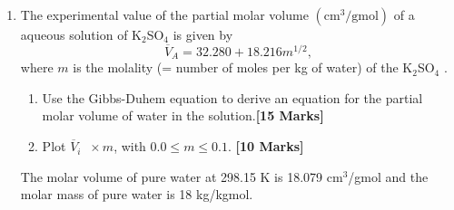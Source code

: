 \documentclass[12pts,a4paper,amsmath,amssymb,floatfix]{article}%
\renewcommand\leq{\leqslant}
\begin{document}
\begin{enumerate}[label=\bfseries Problem \arabic*]
{\begin{enumerate}
\begin{eqnarray}
                &=& 2.3281\times 10^{-2} \nonumber
           \end{eqnarray}
           The cubic equation (Eqn.~\ref{example3:cubicZ}) becomes ~\hfill{\bf [3/15]}
           \begin{displaymath}
              Z^{3} - 1.023281 Z^{2} + 7.7095\times 10^{-2} Z - 1.7948\times 10^{-3} = 0
           \end{displaymath}
           Solving this polynomial of order 3 results in 3 roots:~\hfill{\bf [3/15]}
           \begin{eqnarray}
               && Z _{1} = 3.9844\times 10^{-2} \;\;\;\text{(smallest real root)} \nonumber\\
               && Z_{2} = 3.9844\times 10^{-2} - i \;\;\;\text{(root with imaginary component)} \nonumber\\
               && Z_{3} = 0.9436 \;\;\;\text{(largest real root)}\nonumber
           \end{eqnarray}
      Replacing $Z$ in Eqn.~\ref{example3:eqn7b}, leads to ${\bf f= 1.3250\times 10^{6}\text{ Pa}}$.~\hfill{\bf [4/15]}
   

\end{enumerate}}

\clearpage

\item\label{Example:4} The experimental value of the partial molar volume $\left(\text{cm}^{3}/\text{gmol}\right)$ of a aqueous solution of K$_{2}$SO$_{4}$ is given by
                \begin{displaymath}
                   \overline{V}_{A} = 32.280 + 18.216 m^{1/2},
                \end{displaymath} 
 where $m$ is the molality (= number of moles per kg of water) of the K$_{2}$SO$_{4}$ . 
     \begin{enumerate}%
         \item Use the Gibbs-Duhem equation to derive an equation for the partial molar volume of water in the solution.\hfill{\bf [15 Marks]}
         \item Plot $\overline{V}_{i}\;\;\times m$, with $0.0\leq m\leq 0.1$. \hfill{\bf [10 Marks]}
     \end{enumerate}
    The molar volume of pure water at 298.15 K is 18.079 cm$^{3}$/gmol and the molar mass of pure water is 18 kg/kgmol.

\bigskip


\end{enumerate}
\end{document}
